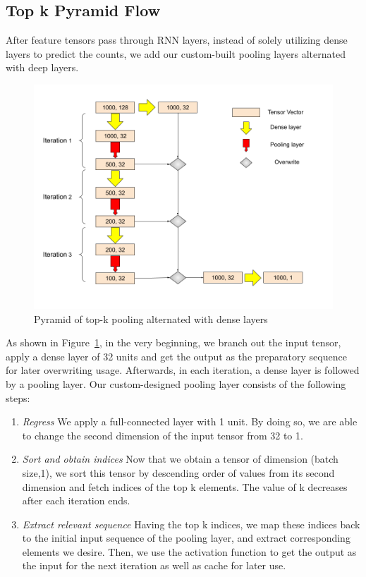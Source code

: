 \subsection{Top k Pyramid Flow}

After feature tensors pass through RNN layers, instead of solely utilizing dense layers to predict the counts, we add our custom-built pooling layers alternated with deep layers.

\begin{figure}[htbp!]
\centering
\includegraphics[width=\textwidth]{images/workflow/topk_pyramid.png}
\caption{Pyramid of top-k pooling alternated with dense layers}
\label{fig:topk_pyramid}
\end{figure}

As shown in Figure~\ref{fig:topk_pyramid}, in the very beginning, we branch out the input tensor, apply a dense layer of 32 units and get the output as the preparatory sequence for later overwriting usage. Afterwards, in each iteration, a dense layer is followed by a pooling layer. Our custom-designed pooling layer consists of the following steps:

\begin{enumerate}
    \item \emph{Regress} We apply a full-connected layer with 1 unit. By doing so, we are able to change the second dimension of the input tensor from 32 to 1.
    
    \item \emph{Sort and obtain indices} Now that we obtain a tensor of dimension (batch size,1), we sort this tensor by descending order of values from its second dimension and fetch indices of the top k elements. The value of k decreases after each iteration ends.  

    \item \emph{Extract relevant sequence} Having the top k indices, we map these indices back to the initial input sequence of the pooling layer, and extract corresponding elements we desire. Then, we use the activation function to get the output as the input for the next iteration as well as cache for later use.

\end{enumerate}

